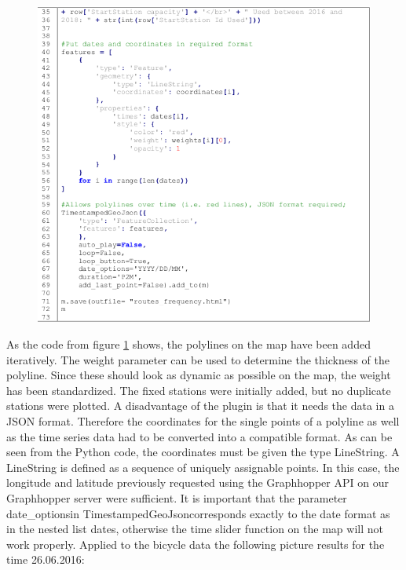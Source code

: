 \begin{figure}[H]
\hspace{-1.6cm}
\includegraphics[width=1.2\textwidth]{img/listing2}\label{fig:listing2}
\label{fig:listing2}
\end{figure}
As the code from figure \ref{fig:listing2} shows, the polylines on the map have been added iteratively. The
weight parameter can be used to determine the thickness of the polyline. Since these should look
as dynamic as possible on the map, the weight has been standardized. The fixed stations were
initially added, but no duplicate stations were plotted. A disadvantage of the plugin is that it needs
the data in a JSON format. Therefore the coordinates for the single points of a polyline as well as
the time series data had to be converted into a compatible format. As can be seen from the Python
code, the coordinates must be given the type \glqq LineString\grqq.  A LineString is defined as a sequence
of uniquely assignable points. In this case, the longitude and latitude previously requested using
the Graphhopper API on our Graphhopper server were sufficient. It is important that the parameter \glqq date\_options\grqq in \glqq TimestampedGeoJson\grqq corresponds exactly to the date format as in the nested
list dates, otherwise the time slider function on the map will not work properly.
Applied to the bicycle data the following picture results for the time 26.06.2016:
